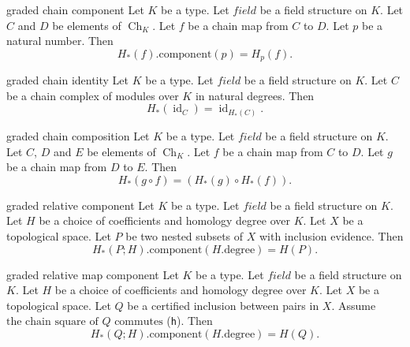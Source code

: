 \begin{cleanresult}{graded chain component}
Let $K$ be a type.
Let $\mathit{field}$ be a field structure on $K$.
Let $C$ and $D$ be elements of $\operatorname{Ch}_{K}$.
Let $f$ be a chain map from $C$ to $D$.
Let $p$ be a natural number.
Then \[H_*(f).\mathrm{component}(p) = H_{p}(f).\]
\end{cleanresult}

\begin{cleanresult}{graded chain identity}
Let $K$ be a type.
Let $\mathit{field}$ be a field structure on $K$.
Let $C$ be a chain complex of modules over $K$ in natural degrees.
Then \[H_*(\operatorname{id}_{C}) = \operatorname{id}_{H_*(C)}.\]
\par{}
\end{cleanresult}

\begin{cleanresult}{graded chain composition}
Let $K$ be a type.
Let $\mathit{field}$ be a field structure on $K$.
Let $C$, $D$ and $E$ be elements of $\operatorname{Ch}_{K}$.
Let $f$ be a chain map from $C$ to $D$.
Let $g$ be a chain map from $D$ to $E$.
Then \[H_*(g\circ f) = (H_*(g) \circ H_*(f)).\]
\par{}
\end{cleanresult}

\begin{cleanresult}{graded relative component}
Let $K$ be a type.
Let $\mathit{field}$ be a field structure on $K$.
Let $H$ be a choice of coefficients and homology degree over $K$.
Let $X$ be a topological space.
Let $P$ be two nested subsets of $X$ with inclusion evidence.
Then \[H_*(P;H).\mathrm{component}(H.\mathrm{degree}) = H(P).\]
\end{cleanresult}

\begin{cleanresult}{graded relative map component}
Let $K$ be a type.
Let $\mathit{field}$ be a field structure on $K$.
Let $H$ be a choice of coefficients and homology degree over $K$.
Let $X$ be a topological space.
Let $Q$ be a certified inclusion between pairs in $X$.
Assume $\text{the chain square of }Q\text{ commutes}$ (\texttt{h}).
Then \[H_*(Q;H).\mathrm{component}(H.\mathrm{degree}) = H(Q).\]
\end{cleanresult}

